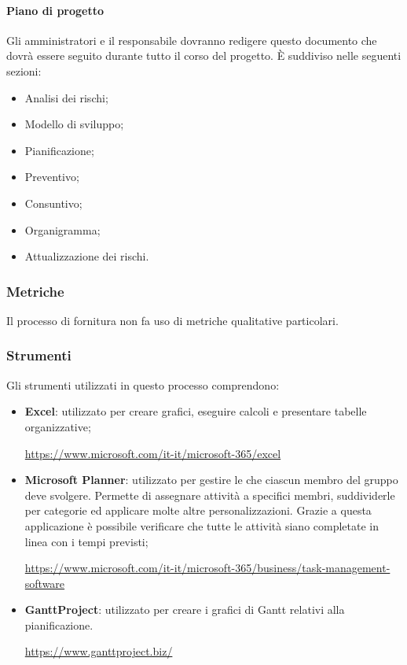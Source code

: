 \paragraph{Piano di progetto}
Gli amministratori e il responsabile dovranno redigere questo documento che dovrà essere seguito durante tutto il corso del progetto. È suddiviso nelle seguenti sezioni:
\begin{itemize}
    \item Analisi dei rischi;
    \item Modello di sviluppo;
    \item Pianificazione;  
    \item Preventivo;
    \item Consuntivo;
    \item Organigramma;
    \item Attualizzazione dei rischi. 
\end{itemize}

\subsubsection{Metriche}
Il processo di fornitura non fa uso di metriche qualitative particolari.

\subsubsection{Strumenti}
Gli strumenti utilizzati in questo processo comprendono:
\begin{itemize}
	\item \textbf{Excel}: utilizzato per creare grafici, eseguire calcoli e presentare tabelle organizzative; 
	\begin{center}
		\textcolor{blue}{\url{https://www.microsoft.com/it-it/microsoft-365/excel}}
	\end{center}
	\item \textbf{Microsoft Planner}: utilizzato per gestire le  che ciascun membro del gruppo deve svolgere. Permette di assegnare attività a specifici membri, suddividerle per categorie ed applicare molte altre personalizzazioni. Grazie a questa applicazione è possibile verificare che tutte le attività siano completate in linea con i tempi previsti; 
	\begin{center}
		\textcolor{blue}{\url{https://www.microsoft.com/it-it/microsoft-365/business/task-management-software}}
	\end{center}
	\item \textbf{GanttProject}: utilizzato per creare i grafici di Gantt relativi alla pianificazione.
	\begin{center}
		\textcolor{blue}{\url{https://www.ganttproject.biz/}}
	\end{center}
\end{itemize}
